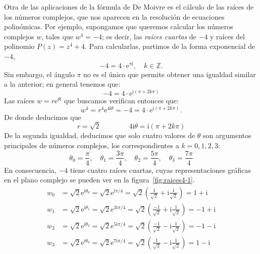 \begin{ejemplo}
%
Otra de las aplicaciones de la fórmula de De Moivre es el cálculo de las raíces de los números complejos, que nos aparecen en la resolución de ecuaciones polinómicas.
Por ejemplo, supongamos que queremos calcular los números complejos $w$, tales que $w^4=-4$; es decir, las \emph{raíces cuartas} de $-4$ y raíces del polinomio $P(z)=z^4+4$.
Para calcularlas, partimos de la forma exponencial de $-4$,
\[
-4 = 4\cdot\mathrm{e}^{\pi\mathrm{i}},\quad k\in\mathbb{Z}.
\]
Sin embargo, el ángulo $\pi$ no es el único que permite obtener una igualdad similar a la anterior; en general tenemos que:
\[
-4 = 4\cdot \mathrm{e}^{\mathrm{i}(\pi+2k\pi)}
\]
Las raíces $w=r\mathrm{e}^{\theta\mathrm{i}}$ que buscamos verifican entonces que:
\[
w^4= r^4 \mathrm{e}^{4\mathrm{i}\theta} = -4 = 4\cdot \mathrm{e}^{\mathrm{i}(\pi+2k\pi)}.
\]
De donde deducimos que
\[
r=\sqrt2\qquad \qquad
4\mathrm{i}\theta=\mathrm{i}(\pi+2k\pi)
\]
De la segunda igualdad, deducimos que solo cuatro valores de $\theta$ son argumentos principales de números complejos, los correspondientes a $k=0,1,2,3$:
\[
\theta_0=\frac{\pi}4,\quad
\theta_1=\frac{3\pi}4,\quad
\theta_2=\frac{5\pi}4,\quad
\theta_3=\frac{7\pi}4
\]
En consecuencia, $-4$ tiene cuatro raíces cuartas, cuyas representaciones gráficas en el plano complejo se pueden ver en la figura~\ref{fig:raices4-1}.
\begin{align*}
w_0&=\sqrt2 \mathrm{e}^{\mathrm{i}\theta_0}=\sqrt2 \mathrm{e}^{ \mathrm{i}\pi/4}
=\sqrt2\left(\frac1{\sqrt2}+\mathrm{i}\frac1{\sqrt2}\right)
= 1+\mathrm{i} \\
w_1&=\sqrt2 \mathrm{e}^{\mathrm{i}\theta_1}=\sqrt2 \mathrm{e}^{3\mathrm{i}\pi/4}
=\sqrt2\left(\frac{-1}{\sqrt2}+\mathrm{i}\frac1{\sqrt2}\right)
= -1+\mathrm{i}\\
w_2&=\sqrt2 \mathrm{e}^{\mathrm{i}\theta_2}=\sqrt2 \mathrm{e}^{5\mathrm{i}\pi/4}
=\sqrt2\left(\frac{-1}{\sqrt2}-\mathrm{i}\frac1{\sqrt2}\right)
= -1-\mathrm{i}\\
w_3&=\sqrt2 \mathrm{e}^{\mathrm{i}\theta_3}=\sqrt2 \mathrm{e}^{7\mathrm{i}\pi/4}
=\sqrt2\left(\frac1{\sqrt2}-\mathrm{i}\frac1{\sqrt2}\right)
= 1-\mathrm{i}
\end{align*}


\end{ejemplo}
